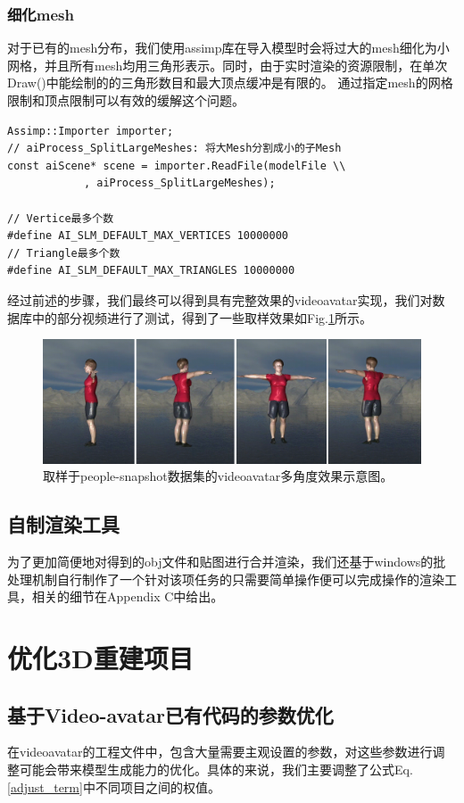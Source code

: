 \documentclass{article}
\begin{document}
\subsubsection{细化mesh}
对于已有的mesh分布，我们使用assimp库在导入模型时会将过大的mesh细化为小网格，并且所有mesh均用三角形表示。同时，由于实时渲染的资源限制，在单次Draw()中能绘制的的三角形数目和最大顶点缓冲是有限的。
通过指定mesh的网格限制和顶点限制可以有效的缓解这个问题。

\begin{lstlisting} 
Assimp::Importer importer;
// aiProcess_SplitLargeMeshes: 将大Mesh分割成小的子Mesh
const aiScene* scene = importer.ReadFile(modelFile \\
			, aiProcess_SplitLargeMeshes);

// Vertice最多个数
#define AI_SLM_DEFAULT_MAX_VERTICES 10000000
// Triangle最多个数
#define AI_SLM_DEFAULT_MAX_TRIANGLES 10000000   
\end{lstlisting}

经过前述的步骤，我们最终可以得到具有完整效果的videoavatar实现，我们对\cite{paper1homepage}数据库中的部分视频进行了测试，得到了一些取样效果如Fig.\ref{videoavatarsample}所示。

\begin{figure}[H]
	\centering
	\includegraphics[width=16cm]{figure/videoavatar_4angle}
	\caption{取样于people-snapshot数据集的videoavatar多角度效果示意图。}
	\label{videoavatarsample}
\end{figure}

\subsection{自制渲染工具}
为了更加简便地对得到的obj文件和贴图进行合并渲染，我们还基于windows的批处理机制自行制作了一个针对该项任务的只需要简单操作便可以完成操作的渲染工具，相关的细节在Appendix C中给出。


\section{优化3D重建项目}
\subsection{基于Video-avatar已有代码的参数优化}
在videoavatar的工程文件中，包含大量需要主观设置的参数，对这些参数进行调整可能会带来模型生成能力的优化。具体的来说，我们主要调整了公式Eq.\ref{adjust_term}中不同项目之间的权值。
\end{document}
